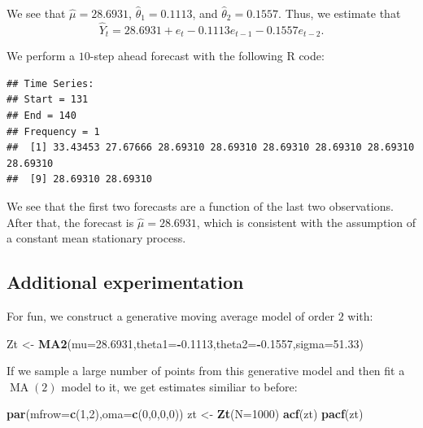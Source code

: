 \documentclass[
]{article}
\newenvironment{Shaded}{\begin{snugshade}}{\end{snugshade}}
\newcommand{\AttributeTok}[1]{\textcolor[rgb]{0.13,0.29,0.53}{#1}}
\newcommand{\DecValTok}[1]{\textcolor[rgb]{0.00,0.00,0.81}{#1}}
\newcommand{\FloatTok}[1]{\textcolor[rgb]{0.00,0.00,0.81}{#1}}
\newcommand{\FunctionTok}[1]{\textcolor[rgb]{0.13,0.29,0.53}{\textbf{#1}}}
\newcommand{\NormalTok}[1]{#1}
\newcommand{\OtherTok}[1]{\textcolor[rgb]{0.56,0.35,0.01}{#1}}
\newcommand{\SpecialCharTok}[1]{\textcolor[rgb]{0.81,0.36,0.00}{\textbf{#1}}}
\begin{document}
We see that \(\hat\mu = 28.6931\), \(\hat\theta_1 = 0.1113\), and
\(\hat\theta_2 = 0.1557\). Thus, we estimate that \[
   \hat{Y}_t = 28.6931 + e_t - 0.1113 e_{t-1} - 0.1557 e_{t-2}.
\]

We perform a \(10\)-step ahead forecast with the following R code:

\begin{Shaded}
\end{Shaded}

\begin{verbatim}
## Time Series:
## Start = 131 
## End = 140 
## Frequency = 1 
##  [1] 33.43453 27.67666 28.69310 28.69310 28.69310 28.69310 28.69310 28.69310
##  [9] 28.69310 28.69310
\end{verbatim}

We see that the first two forecasts are a function of the last two
observations. After that, the forecast is \(\hat\mu = 28.6931\), which
is consistent with the assumption of a constant mean stationary process.

\hypertarget{additional-experimentation-1}{%
\subsection{Additional
experimentation}\label{additional-experimentation-1}}

For fun, we construct a generative moving average model of order \(2\)
with:

\begin{Shaded}
\begin{Highlighting}[]
\NormalTok{Zt }\OtherTok{\textless{}{-}} \FunctionTok{MA2}\NormalTok{(}\AttributeTok{mu=}\FloatTok{28.6931}\NormalTok{,}\AttributeTok{theta1=}\SpecialCharTok{{-}}\FloatTok{0.1113}\NormalTok{,}\AttributeTok{theta2=}\SpecialCharTok{{-}}\FloatTok{0.1557}\NormalTok{,}\AttributeTok{sigma=}\FloatTok{51.33}\NormalTok{)}
\end{Highlighting}
\end{Shaded}

If we sample a large number of points from this generative model and
then fit a \(\operatorname{MA}(2)\) model to it, we get estimates
similiar to before:

\begin{Shaded}
\begin{Highlighting}[]
\FunctionTok{par}\NormalTok{(}\AttributeTok{mfrow=}\FunctionTok{c}\NormalTok{(}\DecValTok{1}\NormalTok{,}\DecValTok{2}\NormalTok{),}\AttributeTok{oma=}\FunctionTok{c}\NormalTok{(}\DecValTok{0}\NormalTok{,}\DecValTok{0}\NormalTok{,}\DecValTok{0}\NormalTok{,}\DecValTok{0}\NormalTok{))}
\NormalTok{zt }\OtherTok{\textless{}{-}} \FunctionTok{Zt}\NormalTok{(}\AttributeTok{N=}\DecValTok{1000}\NormalTok{)}
\FunctionTok{acf}\NormalTok{(zt)}
\FunctionTok{pacf}\NormalTok{(zt)}
\end{Highlighting}
\end{Shaded}
\end{document}
